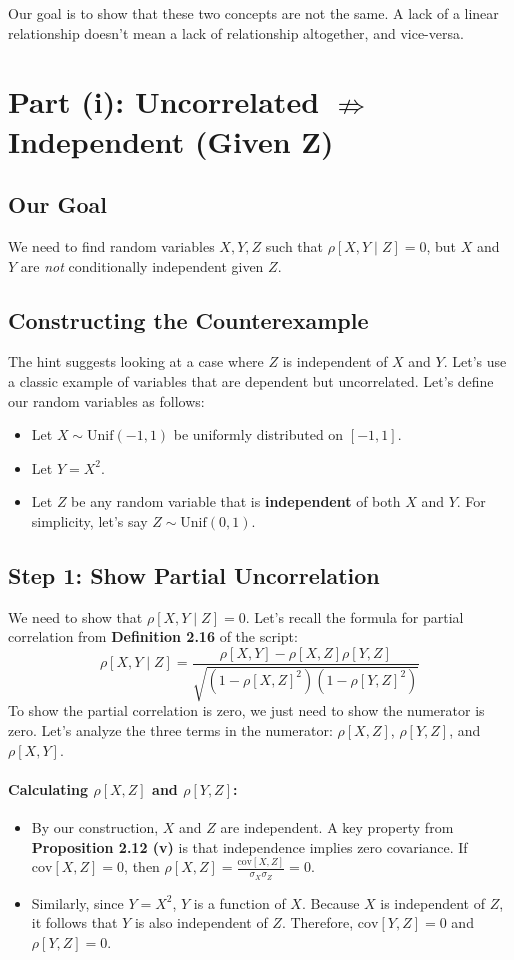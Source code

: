 \documentclass[11pt,a4paper]{article}
\begin{document}
Our goal is to show that these two concepts are not the same. A lack of a linear relationship doesn't mean a lack of relationship altogether, and vice-versa.

\section{Part (i): Uncorrelated \texorpdfstring{$\nRightarrow$}{does not imply} Independent (Given Z)}

\subsection{Our Goal}
We need to find random variables $X, Y, Z$ such that $\rho[X, Y \mid Z] = 0$, but $X$ and $Y$ are \emph{not} conditionally independent given $Z$.

\subsection{Constructing the Counterexample}
The hint suggests looking at a case where $Z$ is independent of $X$ and $Y$. Let's use a classic example of variables that are dependent but uncorrelated.
Let's define our random variables as follows:
\begin{itemize}
    \item Let $X \sim \text{Unif}(-1, 1)$ be uniformly distributed on $[-1, 1]$.
    \item Let $Y = X^2$.
    \item Let $Z$ be any random variable that is \textbf{independent} of both $X$ and $Y$. For simplicity, let's say $Z \sim \text{Unif}(0, 1)$.
\end{itemize}

\subsection{Step 1: Show Partial Uncorrelation}
We need to show that $\rho[X, Y \mid Z] = 0$. Let's recall the formula for partial correlation from \textbf{Definition 2.16} of the script:
\[
\rho[X, Y \mid Z] = \frac{\rho[X, Y] - \rho[X, Z]\rho[Y, Z]}{\sqrt{(1-\rho[X,Z]^2)(1-\rho[Y,Z]^2)}}
\]
To show the partial correlation is zero, we just need to show the numerator is zero. Let's analyze the three terms in the numerator: $\rho[X, Z]$, $\rho[Y, Z]$, and $\rho[X, Y]$.

\paragraph{Calculating $\rho[X, Z]$ and $\rho[Y, Z]$:}
\begin{itemize}
    \item By our construction, $X$ and $Z$ are independent. A key property from \textbf{Proposition 2.12 (v)} is that independence implies zero covariance. If $\text{cov}[X, Z] = 0$, then $\rho[X, Z] = \frac{\text{cov}[X, Z]}{\sigma_X \sigma_Z} = 0$.
    \item Similarly, since $Y=X^2$, $Y$ is a function of $X$. Because $X$ is independent of $Z$, it follows that $Y$ is also independent of $Z$. Therefore, $\text{cov}[Y, Z] = 0$ and $\rho[Y, Z] = 0$.
\end{itemize}
\end{document}
